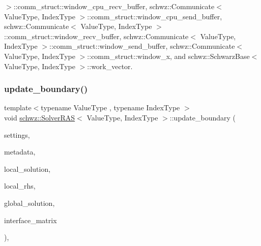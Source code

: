 $>$\+::comm\+\_\+struct\+::window\+\_\+cpu\+\_\+recv\+\_\+buffer, schwz\+::\+Communicate$<$ Value\+Type, Index\+Type $>$\+::comm\+\_\+struct\+::window\+\_\+cpu\+\_\+send\+\_\+buffer, schwz\+::\+Communicate$<$ Value\+Type, Index\+Type $>$\+::comm\+\_\+struct\+::window\+\_\+recv\+\_\+buffer, schwz\+::\+Communicate$<$ Value\+Type, Index\+Type $>$\+::comm\+\_\+struct\+::window\+\_\+send\+\_\+buffer, schwz\+::\+Communicate$<$ Value\+Type, Index\+Type $>$\+::comm\+\_\+struct\+::window\+\_\+x, and schwz\+::\+Schwarz\+Base$<$ Value\+Type, Index\+Type $>$\+::work\+\_\+vector.

\mbox{\label{classschwz_1_1SolverRAS_a974f6e6be558338a37bdc65f34afdb26}} 
\subsubsection{\texorpdfstring{update\+\_\+boundary()}{update\_boundary()}}
{\footnotesize\ttfamily template$<$typename Value\+Type , typename Index\+Type $>$ \\
void \hyperlink{classschwz_1_1SolverRAS}{schwz\+::\+Solver\+R\+AS}$<$ Value\+Type, Index\+Type $>$\+::update\+\_\+boundary (\begin{DoxyParamCaption}\item[{const \hyperlink{structschwz_1_1Settings}{Settings} \&}]{settings,  }\item[{const \hyperlink{structschwz_1_1Metadata}{Metadata}$<$ Value\+Type, Index\+Type $>$ \&}]{metadata,  }\item[{std\+::shared\+\_\+ptr$<$ gko\+::matrix\+::\+Dense$<$ Value\+Type $>$$>$ \&}]{local\+\_\+solution,  }\item[{const std\+::shared\+\_\+ptr$<$ gko\+::matrix\+::\+Dense$<$ Value\+Type $>$$>$ \&}]{local\+\_\+rhs,  }\item[{const std\+::shared\+\_\+ptr$<$ gko\+::matrix\+::\+Dense$<$ Value\+Type $>$$>$ \&}]{global\+\_\+solution,  }\item[{const std\+::shared\+\_\+ptr$<$ gko\+::matrix\+::\+Csr$<$ Value\+Type, Index\+Type $>$$>$ \&}]{interface\+\_\+matrix }\end{DoxyParamCaption})\hspace{0.3cm}{\ttfamily [override]}, {\ttfamily [virtual]}}



